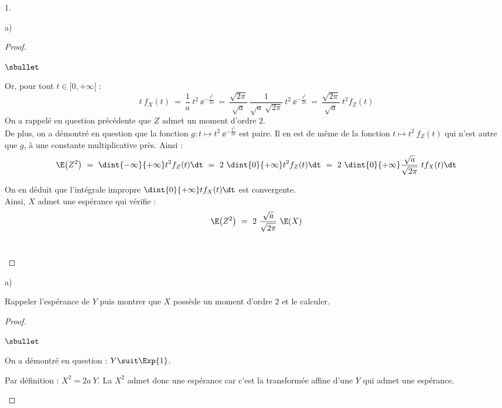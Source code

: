 \documentclass[11pt]{article}%
\begin{document}
\begin{noliste}{1.}
\begin{noliste}{a)}
\begin{proof}
\begin{noliste}{$\sbullet$}
      \item Or, pour tout $t \in [0, +\infty[$ :
        \[
        t \ f_X(t) \ = \ \dfrac{1}{a} \ t^2 \ \ee^{-\frac{t^2}{2a}} \
        = \ \dfrac{\sqrt{2 \pi}}{\sqrt{a}} \ \dfrac{1}{\sqrt{a} \
          \sqrt{2 \pi}} \ t^2 \ \ee^{-\frac{t^2}{2a}} \ = \
        \dfrac{\sqrt{2 \pi}}{\sqrt{a}} \ t^2 f_Z(t)
        \]
        On a rappelé en question précédente que $Z$ admet un moment
        d'ordre $2$.\\
        De plus, on a démontré en question  que la fonction
        $g : t \mapsto t^2 \ \ee^{-\frac{t^2}{2a}}$ est paire. Il en est
        de même de la fonction $t \mapsto t^2 \ f_Z(t)$ qui n'est
        autre que $g$, à une constante multiplicative près. Ainsi :
        \[
        \E\big( Z^2 \big) \ = \ \dint{-\infty}{+\infty} t^2 f_Z(t) \dt
        \ = \ 2 \ \dint{0}{+\infty} t^2 f_Z(t) \dt \ = \ 2 \
        \dint{0}{+\infty} \dfrac{\sqrt{a}}{\sqrt{2 \pi}} \ t f_X(t)
        \dt
        \]

      \item On en déduit que l'intégrale impropre $\dint{0}{+\infty} t
        f_X(t) \dt$ est convergente. \\[.1cm]
        Ainsi, $X$ admet une espérance qui vérifie :
        \[
        \E\big( Z^2 \big) \ = \ 2 \ \dfrac{\sqrt{a}}{\sqrt{2 \pi}} \ \E(X)
        \]
        ~\\[-1.2cm]
      \end{noliste}
    \end{proof}
  \end{noliste}

\item 
  \begin{noliste}{a)}
    \setlength{\itemsep}{2mm}
  \item Rappeler l'espérance de $Y$ puis montrer que $X$ possède un
    moment d'ordre $2$ et le calculer.

    \begin{proof}~%
      \begin{noliste}{$\sbullet$}
      \item On a démontré en question \itbf{3.a)} : $Y \suit
        \Exp{1}$.%

      \item Par définition : $X^2 = 2a \ Y$. La \var $X^2$ admet donc
        une espérance car c'est la transformée affine d'une \var $Y$
        qui admet une espérance.%
        ~\\[-1.2cm]      
      \end{noliste}
    \end{proof}


\end{noliste}
\end{noliste}
\end{document}
